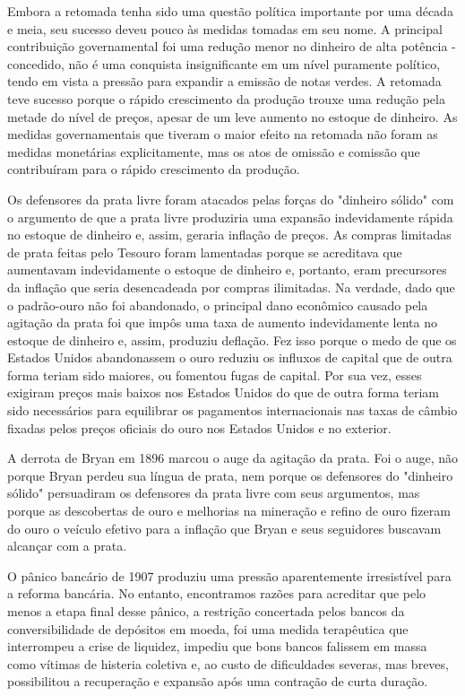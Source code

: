 \documentclass[12pt]{article}
\begin{document}
Embora a retomada tenha sido uma questão política importante por uma década e meia, seu sucesso deveu pouco às medidas tomadas em seu nome. A principal contribuição governamental foi uma redução menor no dinheiro de alta potência - concedido, não é uma conquista insignificante em um nível puramente político, tendo em vista a pressão para expandir a emissão de notas verdes. A retomada teve sucesso porque o rápido crescimento da produção trouxe uma redução pela metade do nível de preços, apesar de um leve aumento no estoque de dinheiro. As medidas governamentais que tiveram o maior efeito na retomada não foram as medidas monetárias explicitamente, mas os atos de omissão e comissão que contribuíram para o rápido crescimento da produção.

Os defensores da prata livre foram atacados pelas forças do "dinheiro sólido" com o argumento de que a prata livre produziria uma expansão indevidamente rápida no estoque de dinheiro e, assim, geraria inflação de preços. As compras limitadas de prata feitas pelo Tesouro foram lamentadas porque se acreditava que aumentavam indevidamente o estoque de dinheiro e, portanto, eram precursores da inflação que seria desencadeada por compras ilimitadas. Na verdade, dado que o padrão-ouro não foi abandonado, o principal dano econômico causado pela agitação da prata foi que impôs uma taxa de aumento indevidamente lenta no estoque de dinheiro e, assim, produziu deflação. Fez isso porque o medo de que os Estados Unidos abandonassem o ouro reduziu os influxos de capital que de outra forma teriam sido maiores, ou fomentou fugas de capital. Por sua vez, esses exigiram preços mais baixos nos Estados Unidos do que de outra forma teriam sido necessários para equilibrar os pagamentos internacionais nas taxas de câmbio fixadas pelos preços oficiais do ouro nos Estados Unidos e no exterior.

A derrota de Bryan em 1896 marcou o auge da agitação da prata. Foi o auge, não porque Bryan perdeu sua língua de prata, nem porque os defensores do "dinheiro sólido" persuadiram os defensores da prata livre com seus argumentos, mas porque as descobertas de ouro e melhorias na mineração e refino de ouro fizeram do ouro o veículo efetivo para a inflação que Bryan e seus seguidores buscavam alcançar com a prata.

O pânico bancário de 1907 produziu uma pressão aparentemente irresistível para a reforma bancária. No entanto, encontramos razões para acreditar que pelo menos a etapa final desse pânico, a restrição concertada pelos bancos da conversibilidade de depósitos em moeda, foi uma medida terapêutica que interrompeu a crise de liquidez, impediu que bons bancos falissem em massa como vítimas de histeria coletiva e, ao custo de dificuldades severas, mas breves, possibilitou a recuperação e expansão após uma contração de curta duração.
\end{document}
